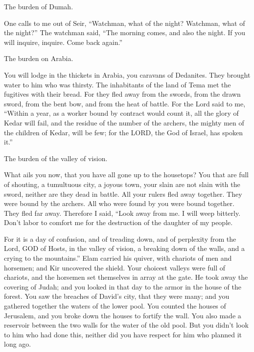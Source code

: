 \myverse{}The burden of Dumah.

One calls to me out of Seir, “Watchman, what of the night? Watchman, what of the night?”
\myverse{}The watchman said, “The morning comes, and also the night. If you will inquire,
inquire. Come back again.”

\myverse{}The burden on Arabia.

You will lodge in the thickets in Arabia, you caravans of Dedanites.
\myverse{}They brought water to him who was thirsty. The inhabitants of the land of
Tema met the fugitives with their bread.
\myverse{}For they fled away from the swords, from the drawn sword, from the bent bow,
and from the heat of battle.
\myverse{}For the Lord said to me, “Within a year, as a worker bound by contract would
count it, all the glory of Kedar will fail,
\myverse{}and the residue of the number of the archers, the mighty men of the children
of Kedar, will be few; for the LORD, the God of Israel, has spoken it.”


\mychapter{} \myverse*{}The burden of the valley of vision.

\quad\quad What ails you now, that you have all gone up to the housetops?
\myverse{}You that are full of shouting, a tumultuous city, a joyous town, your slain
are not slain with the sword, neither are they dead in battle.
\myverse{}All your rulers fled away together. They were bound by the archers. All who
were found by you were bound together. They fled far away.
\myverse{}Therefore I said, “Look away from me. I will weep bitterly. Don’t labor to
comfort me for the destruction of the daughter of my people.

\myverse{}For it is a day of confusion, and of treading down, and of perplexity
from the Lord, GOD of Hosts, in the valley of vision, a breaking down of the walls, and a crying to the
mountains.”
\myverse{}Elam carried his quiver, with chariots of men and horsemen; and Kir uncovered
the shield.
\myverse{}Your choicest valleys were full of chariots, and the horsemen set themselves
in array at the gate.
\myverse{}He took away the covering of Judah; and you looked in that day to the armor
in the house of the forest.
\myverse{}You saw the breaches of David’s city, that they were many; and you gathered
together the waters of the lower pool.
\myverse{}You counted the houses of Jerusalem, and you broke down the houses to fortify
the wall.
\myverse{}You also made a reservoir between the two walls for the water of the old
pool. But you didn’t look to him who had done this, neither did you have respect for him who planned it
long ago.

